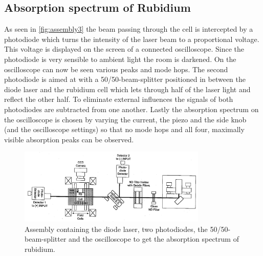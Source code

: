 \subsection{Absorption spectrum of Rubidium}
As seen in \autoref{fig:assembly3} the beam passing through the cell is intercepted by a photodiode which turns the intensity of the laser beam to a proportional voltage.
This voltage is displayed on the screen of a connected oscilloscope.
Since the photodiode is very sensible to ambient light the room is darkened.
On the oscilloscope can now be seen various peaks and mode hops.
The second photodiode is aimed at with a 50/50-beam-splitter positioned in between the diode laser and the rubidium cell which lets through half of the laser light and reflect the other half.
To eliminate external influences the signals of both photodiodes are subtracted from one another.
Lastly the absorption spectrum on the oscilloscope is chosen by varying the current, the piezo and the side knob (and the oscilloscope settings) so that no mode hops and all four, maximally visible absorption peaks can be observed.
\begin{figure}
    \center
    \includegraphics[width=0.8\textwidth]{bilder/Assembly_3.png}
    \caption{Assembly containing the diode laser, two photodiodes, the 50/50-beam-splitter and the oscilloscope to get the absorption spectrum of rubidium. \cite{anleitung}}
    \label{fig:assembly3}
\end{figure}

\FloatBarrier
